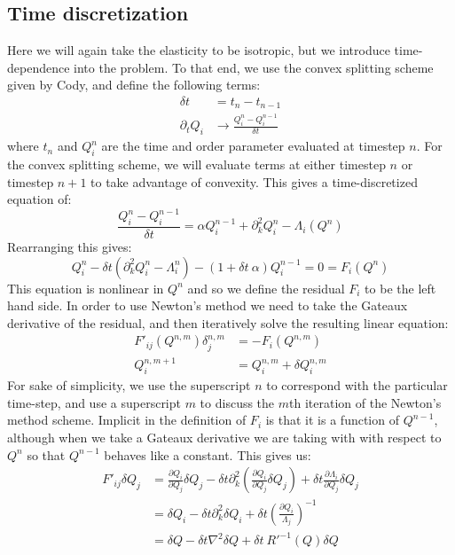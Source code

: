 \documentclass[reqno]{article}
\begin{document}
  \subsection{Time discretization}
  Here we will again take the elasticity to be isotropic, but we introduce
  time-dependence into the problem.
  To that end, we use the convex splitting scheme given by Cody, and define the
  following terms:
  \begin{align}
    \delta t &= t_n - t_{n - 1} \\
    \partial_t Q_i &\to \frac{Q^n_i - Q^{n - 1}_i}{\delta t}
  \end{align}
  where $t_n$ and $Q_i^n$ are the time and order parameter evaluated at timestep
  $n$.
  For the convex splitting scheme, we will evaluate terms at either timestep $n$
  or timestep $n + 1$ to take advantage of convexity.
  This gives a time-discretized equation of:
  \begin{equation}
    \frac{Q^n_i - Q^{n - 1}_i}{\delta t}
    = \alpha Q^{n - 1}_i
    + \partial_k^2 Q_i^n
    - \Lambda_i (Q^n)
  \end{equation}
  Rearranging this gives:
  \begin{equation}
    Q^n_i - \delta t\left( \partial_k^2 Q_i^n - \Lambda_i^n \right) 
    - (1 + \delta t \: \alpha) Q^{n - 1}_i 
    = 0
    = F_i(Q^n)
  \end{equation}
  This equation is nonlinear in $Q^n$ and so we define the residual $F_i$ to be the
  left hand side.
  In order to use Newton's method we need to take the Gateaux derivative of the
  residual, and then iteratively solve the resulting linear equation:
  \begin{align}
    F'_{ij}(Q^{n, m}) \delta^{n, m}_j &= -F_i(Q^{n, m}) \\
    Q^{n, m + 1}_i &= Q^{n, m}_i + \delta Q^{n, m}_i
  \end{align}
  For sake of simplicity, we use the superscript $n$ to correspond with the
  particular time-step, and use a superscript $m$ to discuss the $m$th iteration of
  the Newton's method scheme.
  Implicit in the definition of $F_i$ is that it is a function of $Q^{n - 1}$,
  although when we take a Gateaux derivative we are taking with with respect to
  $Q^n$ so that $Q^{n - 1}$ behaves like a constant.
  This gives us:
  \begin{equation}
  \begin{split}
    F'_{ij} \delta Q_{j}
    &= \frac{\partial Q_i}{\partial Q_j} \delta Q_j
    - \delta t \partial_k^2 \left( \frac{\partial Q_i}{\partial Q_j} \delta Q_j \right)
    + \delta t \frac{\partial \Lambda_i}{\partial Q_j} \delta Q_j \\
    &= \delta Q_i
    - \delta t \partial_k^2 \delta Q_i
    + \delta t \left( \frac{\partial Q_i}{\Lambda_j} \right)^{-1} \\
    &= \delta Q
    - \delta t \nabla^2 \delta Q
    + \delta t \: R'^{-1}(Q) \delta Q
  \end{split}
  \end{equation}
\end{document}
